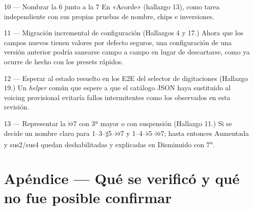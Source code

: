 \documentclass[a4paper,11pt,oneside]{report}
\newcommand{\flt}{\ensuremath{\flat}}
\newcommand{\shp}{\ensuremath{\sharp}}
\begin{document}
\begin{recobox}{10 --- Nombrar la 6 junto a la 7}
En «Acorde» (hallazgo 13), como tarea independiente con sus propias pruebas de nombre, chips e inversiones.
\end{recobox}

\begin{recobox}{11 --- Migración incremental de configuración}
(Hallazgos 4 y 17.) Ahora que los campos nuevos tienen valores por defecto seguros, una configuración de una versión anterior podría sanearse campo a campo en lugar de descartarse, como ya ocurre de hecho con los presets rápidos.
\end{recobox}

\begin{recobox}{12 --- Esperar al estado resuelto en los E2E del selector de digitaciones}
(Hallazgo 19.) Un \textit{helper} común que espere a que el catálogo JSON haya sustituido al voicing provisional evitaría fallos intermitentes como los observados en esta revisión.
\end{recobox}

\begin{recobox}{13 --- Representar la \flt\flt7 con 3ª mayor o con suspensión}
(Hallazgo 11.) Si se decide un nombre claro para 1--3--\shp5--\flt\flt7 y 1--4--\flt5--\flt\flt7; hasta entonces Aumentada y sus2/sus4 quedan deshabilitadas y explicadas en Disminuido con 7\textsuperscript{a}.
\end{recobox}

\chapter*{Apéndice --- Qué se verificó y qué no fue posible confirmar}
\label{sec:apendice}
\end{document}
